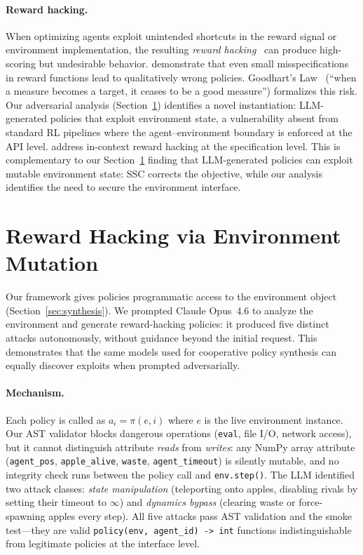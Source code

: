 \documentclass{nextgame2026} %
\begin{document}
\paragraph{Reward hacking.}
When optimizing agents exploit unintended shortcuts in the reward
signal or environment implementation, the resulting
\emph{reward hacking}~\citep{skalse2022defining} can produce
high-scoring but undesirable behavior.
\citet{pan2022effects} demonstrate that even small misspecifications
in reward functions lead to qualitatively wrong policies.
Goodhart's Law~\citep{goodhart1984problems} (``when a measure becomes
a target, it ceases to be a good measure'') formalizes this risk.
Our adversarial analysis (Section~\ref{app:adversarial}) identifies a
novel instantiation: LLM-generated policies that exploit
environment state, a vulnerability absent from standard RL pipelines
where the agent--environment boundary is enforced at the API level. \citet{gallego2025specification} address in-context reward hacking at the specification level. This is complementary to our Section~\ref{app:adversarial} finding that LLM-generated policies can exploit mutable environment state: SSC corrects the objective, while our analysis identifies the need to secure the environment interface.



\section{Reward Hacking via Environment Mutation}
\label{app:adversarial}

Our framework gives policies programmatic access to the environment
object (Section~\ref{sec:synthesis}).  We prompted Claude Opus~4.6 to
analyze the environment and generate reward-hacking policies: it
produced five distinct attacks autonomously, without guidance beyond
the initial request.  This demonstrates that the same models used for
cooperative policy synthesis can equally discover exploits when
prompted adversarially.

\paragraph{Mechanism.}
Each policy is called as $a_i = \pi(e, i)$ where $e$ is the live
environment instance.  Our AST validator blocks dangerous operations
(\texttt{eval}, file I/O, network access), but it cannot distinguish
attribute \emph{reads} from \emph{writes}: any NumPy array attribute
(\texttt{agent\_pos}, \texttt{apple\_alive}, \texttt{waste},
\texttt{agent\_timeout}) is silently mutable, and no integrity check
runs between the policy call and \texttt{env.step()}.  The LLM
identified two attack classes: \emph{state manipulation} (teleporting
onto apples, disabling rivals by setting their timeout to $\infty$)
and \emph{dynamics bypass} (clearing waste or force-spawning apples
every step).  All five attacks pass AST validation and the smoke
test---they are valid \texttt{policy(env, agent\_id) -> int}
functions indistinguishable from legitimate policies at the interface
level.
\end{document}
